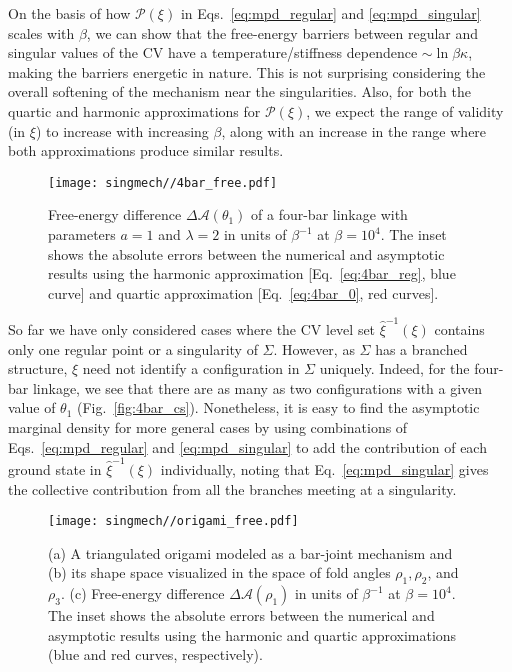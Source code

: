 On the basis of how $\mathscr{P}(\xi)$ in Eqs.~\eqref{eq:mpd_regular} and \eqref{eq:mpd_singular} scales with $\beta$, we can show that the free-energy barriers between regular and singular values of the CV have a temperature/stiffness dependence $\sim\ln\beta\kappa$, making the barriers energetic in nature.
This is not surprising considering the overall softening of the mechanism near the singularities.
Also, for both the quartic and harmonic approximations for $\mathscr{P}(\xi)$, we expect the range of validity (in $\xi$) to increase with increasing $\beta$, along with an increase in the range where both approximations produce similar results.
%
\begin{figure}
  \begin{center}
    \texttt{[image: singmech//4bar\_free.pdf]}
  \end{center}
  \caption{Free-energy difference $\Delta\mathscr{A}(\theta_1)$ of a four-bar linkage with parameters $a=1$ and $\lambda=2$ in units of $\beta^{-1}$ at $\beta = 10^{4}$.
  The inset shows the absolute errors between the numerical and asymptotic results using the harmonic approximation [Eq.~\eqref{eq:4bar_reg}, blue curve] and quartic approximation [Eq.~\eqref{eq:4bar_0}, red curves].}
  \label{fig:4bar_free}
\end{figure}

So far we have only considered cases where the CV level set $\hat{\xi}^{-1}(\xi)$ contains only one regular point or a singularity of $\Sigma$.
However, as $\Sigma$ has a branched structure, $\xi$ need not identify a configuration in $\Sigma$ uniquely.
Indeed, for the four-bar linkage, we see that there are as many as two configurations with a given value of $\theta_{1}$ (Fig.~\ref{fig:4bar_cs}).
Nonetheless, it is easy to find the asymptotic marginal density for more general cases by using combinations of Eqs.~\eqref{eq:mpd_regular} and \eqref{eq:mpd_singular} to add the contribution of each ground state in $\hat{\xi}^{-1}(\xi)$ individually, noting that Eq.~\eqref{eq:mpd_singular} gives the collective contribution from all the branches meeting at a singularity.
%
\begin{figure*}
  \begin{center}
    \texttt{[image: singmech//origami\_free.pdf]}
  \end{center}
  \caption{(a) A triangulated origami modeled as a bar-joint mechanism and (b) its shape space visualized in the space of fold angles $\rho_{1}, \rho_{2}$, and $\rho_{3}$.
    (c) Free-energy difference $\Delta\mathscr{A}(\rho_{1})$ in units of $\beta^{-1}$ at $\beta = 10^{4}$.
  The inset shows the absolute errors between the numerical and asymptotic results using the harmonic and quartic approximations (blue and red curves, respectively).}
  \label{fig:origami}
\end{figure*}

